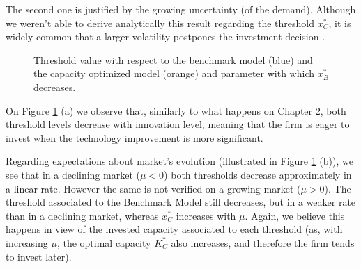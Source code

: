 The second one is justified by the growing uncertainty (of the demand). Although we weren't able to derive analytically this result regarding the threshold $x_C^*$, it is widely common that a larger volatility postpones the investment decision \cite{dixit:book}. 


\begin{figure}[!htb]
	\begin{subfigmatrix}{2}
	\end{subfigmatrix}
	\caption{Threshold value with respect to the benchmark model (blue) and the capacity optimized model (orange) and parameter with which  $x^*_B$ decreases.}
	\label{fig:2_x3}
\end{figure}



On Figure \ref{fig:2_x3} (a) we observe that, similarly to what happens on Chapter 2, both threshold levels decrease with innovation level, meaning that the firm is eager to invest when the technology improvement is more significant.

Regarding expectations about market's evolution (illustrated in Figure \ref{fig:2_x3} (b)), we see that in a declining market ($\mu<0$) both thresholds decrease approximately in a linear rate. However the same is not verified on a growing market ($\mu>0$). The threshold associated to the Benchmark Model still decreases, but in a weaker rate than in a declining market, whereas $x^*_C$ increases with $\mu$. Again, we believe this happens in view of the invested capacity associated to each threshold (as, with increasing $\mu$, the optimal capacity $K^*_C$ also increases, and therefore the firm tends to invest later).

